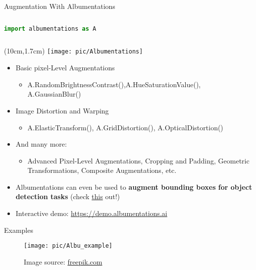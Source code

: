 \documentclass[serif, aspectratio=169]{beamer}
\begin{document}
\begin{frame}[fragile]{Augmentation With Albumentations}

	\begin{column}{.43\textwidth}
\begin{lstlisting}[language=python]
import albumentations as A
\end{lstlisting}
	\end{column}
	
	\begin{textblock*}{5cm}(10cm,1.7cm) %
		\texttt{[image: pic/Albumentations]}
	\end{textblock*}
	
	\vspace{0.5cm}
	\begin{itemize}
		\item Basic pixel-Level Augmentations
		\begin{itemize}
			\item 
			{\sffamily A.RandomBrightnessContrast(),A.HueSaturationValue(), 
				A.GaussianBlur()}
		\end{itemize}
		
		\item Image Distortion and Warping
		\begin{itemize}
			\item {\sffamily A.ElasticTransform(), A.GridDistortion(), A.OpticalDistortion()}
		\end{itemize}
		\item And many more:
		\begin{itemize}
			\item Advanced Pixel-Level Augmentations, Cropping and Padding, Geometric Transformations, Composite Augmentations, etc.
		\end{itemize}
		\item Albumentations can even be used to \textbf{augment bounding boxes for object detection tasks} (check \href{https://albumentations.ai/docs/examples/example_bboxes/}{\color{blue}this} out!)
		\item Interactive demo: \href{https://demo.albumentations.ai}{\color{blue} https://demo.albumentations.ai}

	\end{itemize}
\end{frame}

\begin{frame}{Examples}	

	\begin{figure}
		\begin{center}
			\texttt{[image: pic/Albu\_example]}
			\caption*{Image source: \href{http://freepik.com}{\color{blue}freepik.com}}
		\end{center}
	\end{figure}
\end{frame}
\end{document}
